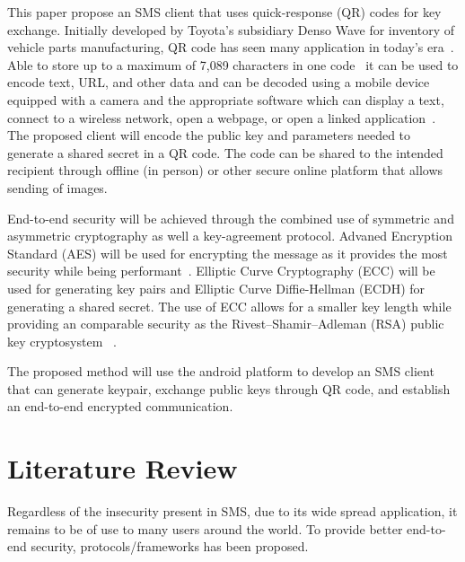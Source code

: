 \documentclass[journal]{./IEEE/IEEEtran}
\begin{document}
This paper propose an SMS client that uses
quick-response (QR) codes for key exchange. Initially developed by Toyota's
subsidiary Denso Wave for inventory of vehicle parts manufacturing,
QR code has seen many application in today's era~\cite{Tiwari_2016}.
Able to store up to a maximum of 7,089 characters in one code~\cite{qrcode}
it can be used to encode text, URL, and other data and can be decoded using
a mobile device equipped with a camera and the appropriate software which can
display a text, connect to a wireless network, open a webpage, or open a linked
application~\cite{Shin_Jung_Chang_2012}. The proposed client will encode the
public key and parameters needed to generate a shared secret in a QR code. The
code can be shared to the intended recipient through offline (in person)
or other secure online platform that allows sending of images.

End-to-end security will be achieved through the combined use of symmetric and
asymmetric cryptography as well a key-agreement protocol. Advaned Encryption
Standard (AES) will be used for encrypting the message as it provides the
most security while being performant~\cite{Karale_Pendke_Dahiwale_2015}.
Elliptic Curve Cryptography (ECC) will be used for generating key pairs and
Elliptic Curve Diffie-Hellman (ECDH) for generating a shared secret. The use
of ECC allows for a smaller key length while providing an comparable security
as the Rivest–Shamir–Adleman (RSA) public key cryptosystem
~\cite{Amara_Siad_2011}.

The proposed method will use the android platform to  develop an SMS client
that can generate keypair, exchange public keys through QR code, and establish
an end-to-end encrypted communication.

\section{Literature Review}
Regardless of the insecurity present in SMS, due to its wide spread
application, it remains to be of use to many users around the world.
To provide better end-to-end security, protocols/frameworks has been proposed.
\end{document}
